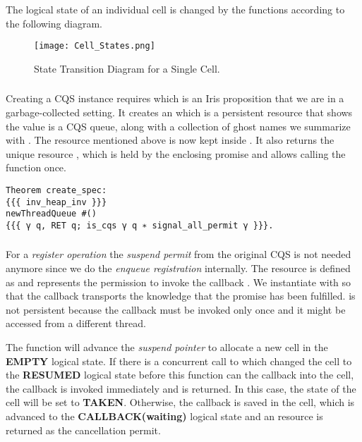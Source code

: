 The logical state of an individual cell is changed by the functions according to the following diagram.

\begin{figure}[ht]
  \texttt{[image: Cell\_States.png]}
  \caption{State Transition Diagram for a Single Cell.}
  \label{fig:cqs-cell-states}
\end{figure}

\subsubsection{}
\label{sec:cqs-spec-create}

Creating a CQS instance requires  which is an Iris proposition that we are in a garbage-collected setting.
It creates an  which is a persistent resource that shows the value  is a CQS queue, along with a collection of ghost names we summarize with .
The resource  mentioned above is now kept inside .
It also returns the unique resource \gssignal{}, which is held by the enclosing promise and allows calling the  function once.

\begin{verbatim}
Theorem create_spec:
{{{ inv_heap_inv }}}
newThreadQueue #()
{{{ γ q, RET q; is_cqs γ q ∗ signal_all_permit γ }}}.
\end{verbatim}

\subsubsection{}
\label{sec:cqs-spec-suspend}

For a \emph{register operation} the \emph{suspend permit} from the original CQS is not needed anymore since we do the \emph{enqueue registration} internally.
The  resource is defined as  and represents the permission to invoke the callback .
We instantiate  with \gspdone{} so that the callback transports the knowledge that the promise has been fulfilled.
 is not persistent because the callback must be invoked only once and it might be accessed from a different thread.

The  function will advance the \emph{suspend pointer} to allocate a new cell in the \textbf{EMPTY} logical state.
If there is a concurrent call to  which changed the cell to the \textbf{RESUMED} logical state before this function can  the callback into the cell, the callback is invoked immediately and  is returned.
In this case, the state of the cell will be set to \textbf{TAKEN}.
Otherwise, the callback is saved in the cell, which is advanced to the \textbf{CALLBACK(waiting)} logical state and an  resource is returned as the cancellation permit.

